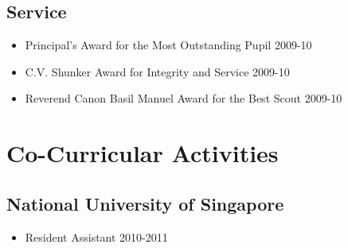\documentclass[11pt,a4paper]{moderncv}
\begin{document}
\subsection{Service}
\begin{itemize}
\item Principal’s Award for the Most Outstanding Pupil \hfill 2009-10
\item C.V. Shunker Award for Integrity and Service \hfill 2009-10
\item Reverend Canon Basil Manuel Award for the Best Scout \hfill 2009-10
\end{itemize}
\begin{comment}
\subsection{Boy Scouts}
\item Best Scout Camper in Annual Scouts and Cubs Winter Camp \hfill 2006
\item Winner of Annual Hechle Ambulance Shield First Aid Competition \hfill 2008
\item First Runner Up of Annual Scouts and Guides Quiz Competition \hfill 2007
\end{comment}
\section{Co-Curricular Activities}
\subsection{National University of Singapore}
\begin{itemize}
    \item Resident Assistant \hfill 2010-2011
\end{itemize}
\end{document}
